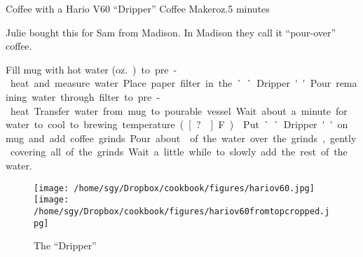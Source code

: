 \begin{recipe}{Coffee with a Hario V60\tm{} ``Dripper'' Coffee Maker}{\unit[6--8]{oz.}}{5 minutes}

\freeform Julie bought this for Sam from Madison.  In Madison they
call it ``pour-over'' coffee.

 Fill mug with hot water
(\unit[6--8]{oz.}) to pre-heat and measure water.  Place paper filter in the
``Dripper.'' Pour remaining water through filter to pre-heat.
Transfer water from mug to pourable vessel.  Wait about a minute for water to cool to brewing temperature (\unit[?\0]{F}).

 Put ``Dripper'' on mug and add coffee
grinds.  Pour about  of the water over the grinds, gently
covering all of the grinds.  Wait a little while to slowly add the
rest of the water.

\end{recipe}
\begin{figure}[b!]
\begin{center}
\texttt{[image: /home/sgy/Dropbox/cookbook/figures/hariov60.jpg]}
\hspace{0.1\textwidth}
\texttt{[image: /home/sgy/Dropbox/cookbook/figures/hariov60fromtopcropped.jpg]}
\end{center}
\caption*{The ``Dripper'' }
\end{figure}
